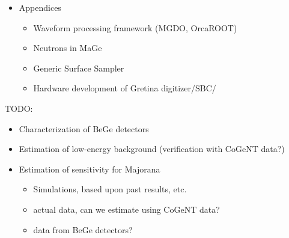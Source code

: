 \documentclass{article}
\begin{document}
\begin{itemize}
    \item Appendices
    \begin{itemize}
      \item Waveform processing framework (MGDO, OrcaROOT)
      \item Neutrons in MaGe
      \item Generic Surface Sampler
      \item Hardware development of Gretina digitizer/SBC/
    \end{itemize}
  \end{itemize}

  TODO:
  \begin{itemize}
    \item Characterization of BeGe detectors
    \item Estimation of low-energy background (verification with CoGeNT data?)
    \item Estimation of sensitivity for Majorana
    \begin{itemize}
      \item Simulations, based upon past results, etc.
      \item actual data, can we estimate using CoGeNT data?
      \item data from BeGe detectors?
    \end{itemize} 
    
  \end{itemize} 
\end{document}
